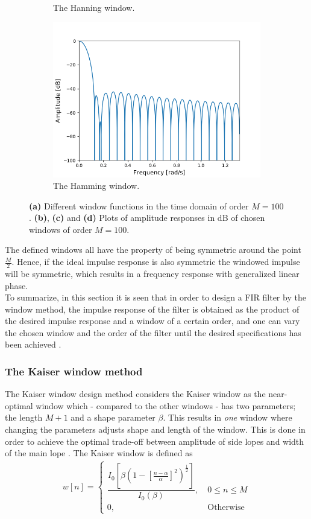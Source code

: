 \begin{figure}[H]
\begin{subfigure}{0.49\textwidth}
\caption{The Hanning window.}
\label{fig:hann_db}
\includegraphics[width=\textwidth]{figures/dbplots/hamming.png}
\caption{The Hamming window.}
\label{fig:hamming_db}
\end{subfigure}
\caption{\textbf{(a)} Different window functions in the time domain of order $M=100$. \textbf{(b)}, \textbf{(c)} and \textbf{(d)} Plots of amplitude responses in dB of chosen windows of order $M=100$.}
\label{fig:windows}
\end{figure}

The defined windows all have the property of being symmetric around the point $\frac{M}{2}$. Hence, if the ideal impulse response is also symmetric the windowed impulse will be symmetric, which results in a frequency response with generalized linear phase. \\
To summarize, in this section it is seen that in order to design a FIR filter by the window method, the impulse response of the filter is obtained as the product of the desired impulse response and a window of a certain order, and one can vary the chosen window and the order of the filter until the desired specifications has been achieved .

\subsubsection{The Kaiser window method}
The Kaiser window design method considers the Kaiser window as the near-optimal window which - compared to the other windows - has two parameters; the length $M+1$ and a shape parameter $\beta$. This results in \textit{one} window where changing the parameters adjusts shape and length of the window. This is done in order to achieve the optimal trade-off between amplitude of side lopes and width of the main lope \cite{page 566, DTSP}. The Kaiser window is defined as
\begin{align}
w[n]=\left\{\begin{matrix}
 \dfrac{I_0[\beta (1-[\frac{n-\alpha}{\alpha}]^2)^{\frac{1}{2}}]}{I_0(\beta)} , &\ 0 \leq n \leq M  \\ 
0, &\ \text{Otherwise}
\end{matrix}\right.
\end{align}

